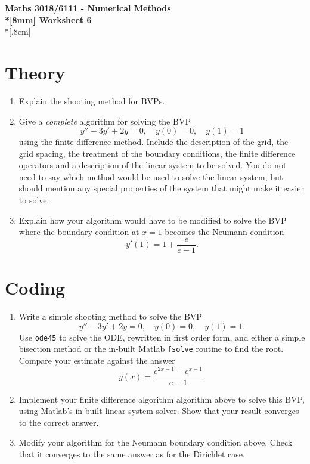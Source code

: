 \documentclass[10pt]{article}
\begin{document}
\thispagestyle{empty}
\begin{center}
\textbf{\Large Maths 3018/6111 - Numerical Methods \\*[8mm]
Worksheet 6}\\*[.8cm]
\end{center}

\section*{Theory}

\begin{enumerate}
\item Explain the shooting method for BVPs.
\item Give a \emph{complete} algorithm for solving the BVP
  \begin{equation*}
    y'' - 3 y' + 2 y = 0, \quad y(0) = 0, \quad y(1) = 1
  \end{equation*}
  using the finite difference method. Include the description of the
  grid, the grid spacing, the treatment of the boundary conditions,
  the finite difference operators and a description of the linear
  system to be solved. You do not need to say which method would be
  used to solve the linear system, but should mention any special
  properties of the system that might make it easier to solve.
\item Explain how your algorithm would have to be modified to solve
  the BVP where the boundary condition at $x=1$ becomes the Neumann
  condition 
  \begin{equation*}
    y'(1) = 1 + \frac{e}{e-1}.
  \end{equation*}
\end{enumerate}

\section*{Coding}

\begin{enumerate}
\item Write a simple shooting method to solve the BVP
  \begin{equation*}
    y'' - 3 y' + 2 y = 0, \quad y(0) = 0, \quad y(1) = 1.
  \end{equation*}
  Use {\tt ode45} to solve the ODE, rewritten in first order form, and
  either a simple bisection method or the in-built Matlab {\tt fsolve}
  routine to find the root. Compare your estimate against the answer
  \begin{equation*}
    y(x) = \frac{e^{2 x - 1} - e^{x - 1}}{e - 1}.
  \end{equation*}
\item Implement your finite difference algorithm algorithm above to
  solve this BVP, using Matlab's in-built linear system solver. Show
  that your result converges to the correct answer.
\item Modify your algorithm for the Neumann boundary condition
  above. Check that it converges to the same answer as for the
  Dirichlet case.
\end{enumerate}
\end{document}
